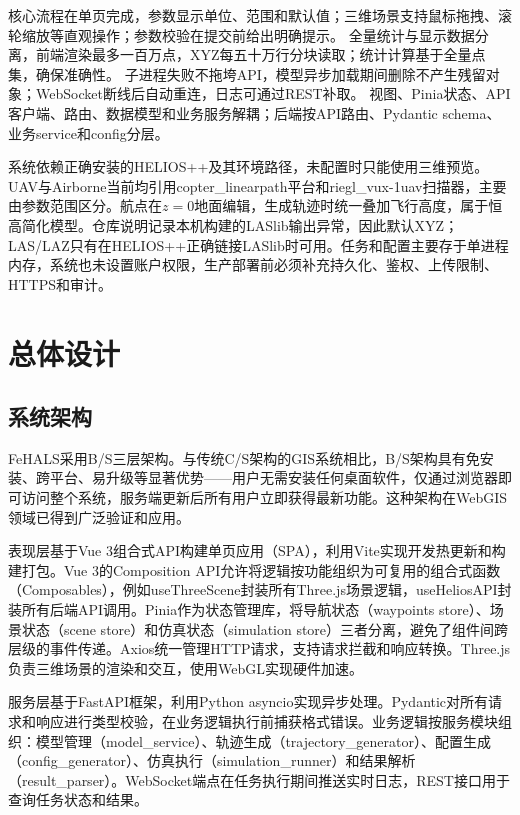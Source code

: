 \documentclass[a4paper,fleqn]{cas-sc}
\begin{document}
\begin{description}
     核心流程在单页完成，参数显示单位、范围和默认值；三维场景支持鼠标拖拽、滚轮缩放等直观操作；参数校验在提交前给出明确提示。
     全量统计与显示数据分离，前端渲染最多一百万点，XYZ每五十万行分块读取；统计计算基于全量点集，确保准确性。
     子进程失败不拖垮API，模型异步加载期间删除不产生残留对象；WebSocket断线后自动重连，日志可通过REST补取。
     视图、Pinia状态、API客户端、路由、数据模型和业务服务解耦；后端按API路由、Pydantic schema、业务service和config分层。
\end{description}

系统依赖正确安装的HELIOS++及其环境路径，未配置时只能使用三维预览。UAV与Airborne当前均引用copter\_linearpath平台和riegl\_vux-1uav扫描器，主要由参数范围区分。航点在$z=0$地面编辑，生成轨迹时统一叠加飞行高度，属于恒高简化模型。仓库说明记录本机构建的LASlib输出异常，因此默认XYZ；LAS/LAZ只有在HELIOS++正确链接LASlib时可用。任务和配置主要存于单进程内存，系统也未设置账户权限，生产部署前必须补充持久化、鉴权、上传限制、HTTPS和审计。

\section{总体设计}

\subsection{系统架构}

FeHALS采用B/S三层架构。与传统C/S架构的GIS系统相比，B/S架构具有免安装、跨平台、易升级等显著优势——用户无需安装任何桌面软件，仅通过浏览器即可访问整个系统，服务端更新后所有用户立即获得最新功能。这种架构在WebGIS领域已得到广泛验证和应用\citep{viswebdrone,lidarWebgis,pointCloudWeb}。

表现层基于Vue 3组合式API构建单页应用（SPA），利用Vite实现开发热更新和构建打包\citep{vite}。Vue 3的Composition API允许将逻辑按功能组织为可复用的组合式函数（Composables），例如useThreeScene封装所有Three.js场景逻辑，useHeliosAPI封装所有后端API调用。Pinia作为状态管理库\citep{pinia}，将导航状态（waypoints store）、场景状态（scene store）和仿真状态（simulation store）三者分离，避免了组件间跨层级的事件传递。Axios统一管理HTTP请求，支持请求拦截和响应转换。Three.js负责三维场景的渲染和交互，使用WebGL实现硬件加速\citep{threejs,webgl}。

服务层基于FastAPI框架\citep{fastapi}，利用Python asyncio实现异步处理。Pydantic对所有请求和响应进行类型校验，在业务逻辑执行前捕获格式错误\citep{pydantic}。业务逻辑按服务模块组织：模型管理（model\_service）、轨迹生成（trajectory\_generator）、配置生成（config\_generator）、仿真执行（simulation\_runner）和结果解析（result\_parser）。WebSocket端点在任务执行期间推送实时日志，REST接口用于查询任务状态和结果。
\end{document}
